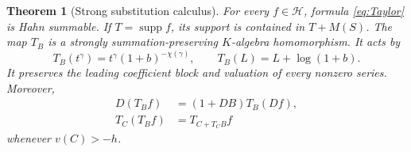 \documentclass[11pt,a4paper]{article}
\newtheorem{theorem}{Theorem}[section]
\theoremstyle{definition}
\theoremstyle{remark}
\newcommand{\HH}{\mathscr H}
\newcommand{\supp}{\operatorname{supp}}
\begin{document}
\begin{theorem}[Strong substitution calculus]\label{thm:substitution}
For every $f\in\HH$, formula \eqref{eq:Taylor} is Hahn summable. If
$T=\supp f$, its support is contained in $T+M(S)$. The map $T_B$ is a
strongly summation-preserving $K$-algebra homomorphism. It acts by
\begin{equation}\label{eq:generators}
 T_B(t^\gamma)=t^\gamma(1+b)^{-\chi(\gamma)},\qquad
 T_B(L)=L+\log(1+b).
\end{equation}
It preserves the leading coefficient block and valuation of every nonzero
series. Moreover,
\begin{align}
 D(T_Bf)&=(1+DB)T_B(Df),\label{eq:chain}\\
 T_C(T_Bf)&=T_{C+T_CB}f\label{eq:association}
\end{align}
whenever $v(C)>-h$.
\end{theorem}
\end{document}
